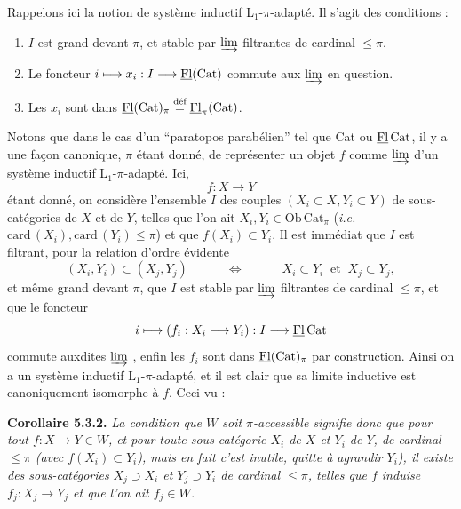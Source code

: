 Rappelons ici la notion de système inductif L$_1$-$\pi$-adapté. Il s'agit des conditions :
\begin{enumerate}[label={}]
\item[1°)] $I$ est grand devant $\pi$, et stable par $\varinjlim$ filtrantes de cardinal $\leq \pi$.
\item[2°)] Le foncteur $i \longmapsto x_i : I \longrightarrow \underline{\mathrm{Fl}}(\mathrm{Cat})$ commute aux $\varinjlim$ en question.
\item[3°)] Les $x_i$ sont dans $\underline{\mathrm{Fl}}(\mathrm{Cat})_\pi \overset{\text{déf}}{=} \underline{\mathrm{Fl}}_\pi(\mathrm{Cat})$.
\end{enumerate}
Notons que dans le cas d'un ``paratopos parabélien'' tel que Cat ou $\underline{\mathrm{Fl}}\,\mathrm{Cat}$, il y a une façon canonique, $\pi$ étant donné, de représenter un objet $f$ comme $\varinjlim$ d'un système inductif L$_1$-$\pi$-adapté. Ici,
\[
f : X \longrightarrow Y
\]
étant donné, on considère l'ensemble $I$ des
couples $(X_i \subset X, Y_i \subset Y)$ de sous-catégories de $X$ et de $Y$, telles que l'on ait $X_i, Y_i \in \mathrm{Ob}\,\mathrm{Cat}_\pi$ (\textit{i.e.} $\mathrm{card}\,(X_i), \mathrm{card}\,(Y_i) \leq \pi$) et que $f(X_i) \subset Y_i$. Il est immédiat que $I$ est filtrant, pour la relation d'ordre évidente
\[
(X_i, Y_i) \subset (X_j, Y_j) \qquad\quad \Longleftrightarrow \qquad\quad X_i \subset Y_i \ \text{ et } \ X_j \subset Y_j, %
\]
et même grand devant $\pi$, que $I$ est stable par $\varinjlim$ filtrantes de cardinal $\leq \pi$, et que le foncteur
\[
i \longmapsto (f_i : X_i \longrightarrow Y_i) : I \longrightarrow \underline{\mathrm{Fl}}\,\mathrm{Cat}
\]
commute auxdites $\varinjlim$ , enfin les $f_i$ sont dans $\underline{\mathrm{Fl}}(\mathrm{Cat})_\pi$ par construction. Ainsi on a un système inductif L$_1$-$\pi$-adapté, et il est clair que sa limite inductive est canoniquement isomorphe à $f$. Ceci vu :

\textbf{Corollaire 5.3.2.} \textit{La condition que $W$ soit $\pi$-accessible signifie donc que pour tout $f : X \longrightarrow Y \in W$, et pour toute sous-catégorie $X_i$ de $X$ et $Y_i$ de $Y$, de cardinal $\leq \pi$ (avec $f(X_i) \subset Y_i$), mais en fait c'est inutile, quitte à agrandir $Y_i$), il existe des sous-catégories} %
\textit{$X_j \supset X_i$ et $Y_j \supset Y_i$ de cardinal $\leq \pi$, telles que $f$ induise $f_j : X_j \longrightarrow Y_j$ et que l'on ait $f_j \in W$.}

